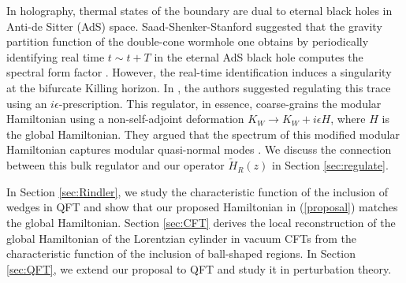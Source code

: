 \documentclass[a4paper,11pt]{article}
\theoremstyle{definition}
\newcommand{\mA}{\mathcal{A}}
\newcommand{\mB}{\mathcal{B}}
\newcommand{\ep}{\epsilon}
\begin{document}
In holography, thermal states of the boundary are dual to eternal black holes in Anti-de Sitter (AdS) space. Saad-Shenker-Stanford suggested that the gravity partition function of the double-cone wormhole one obtains by periodically identifying real time $t\sim t+T$ in the eternal AdS black hole computes the spectral form factor \cite{saad2018semiclassical}. However, the real-time identification induces a singularity at the bifurcate Killing horizon. In \cite{saad2018semiclassical}, the authors suggested regulating this trace using an $i\ep$-prescription. This regulator, in essence, coarse-grains the modular Hamiltonian using a non-self-adjoint deformation $K_W \to K_W +i \epsilon H$, where $H$ is the global Hamiltonian. They argued that the spectrum of this modified modular Hamiltonian captures modular quasi-normal modes \cite{chen2024comments}. We discuss the connection between this bulk regulator and our operator $\tilde{H}_R(z)$ in Section \ref{sec:regulate}.




In Section \ref{sec:Rindler}, we study the characteristic function of the inclusion of wedges in QFT and show that our proposed Hamiltonian in (\ref{proposal}) matches the global Hamiltonian.
Section \ref{sec:CFT} derives the local reconstruction of the global Hamiltonian of the Lorentzian cylinder in vacuum CFTs from the characteristic function of the inclusion of ball-shaped regions. In Section \ref{sec:QFT}, we extend our proposal to QFT and study it in perturbation theory. 

\end{document}
